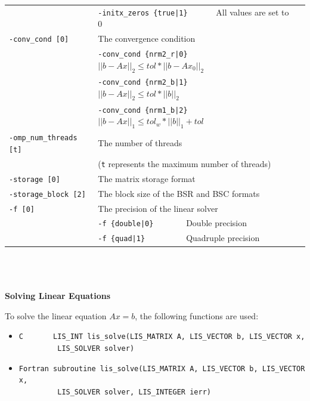 \documentclass[a4paper]{article}
\begin{document}
\begin{minipage}[t]{\textwidth}
\begin{center}
\begin{tabular}{l|ll}
                       & \verb=-initx_zeros {true|1}      =  All values are set to $0$ \\
\verb=-conv_cond [0]= & The convergence condition  \\
                       & \verb=-conv_cond {nrm2_r|0}     =  $||b-Ax||_2 \le tol * ||b-Ax_0||_2$ \\
                       & \verb=-conv_cond {nrm2_b|1}     =  $||b-Ax||_2 \le tol * ||b||_2$ \\
                       & \verb=-conv_cond {nrm1_b|2}     =  $||b-Ax||_1 \le tol_w * ||b||_1 + tol$\\
\verb=-omp_num_threads [t]= & The number of threads        \\ 
                            & (\verb=t= represents the maximum number of
 threads) \\
\verb=-storage [0]=    & The matrix storage format \\
\verb=-storage_block [2]=& The block size of the BSR and BSC formats\\ 
\verb=-f [0]=          & The precision of the linear solver\\
                       & \verb=-f {double|0}       =  Double precision \\ 
                       & \verb=-f {quad|1}         =  Quadruple precision \\
\hline         
\end{tabular}
\end{center}
\end{minipage}
\\ \\ \\
\noindent
{\bf Solving Linear Equations}

To solve the linear equation $Ax = b$, the following functions are used:
\begin{itemize}
\item \verb|C       LIS_INT lis_solve(LIS_MATRIX A, LIS_VECTOR b, LIS_VECTOR x,|\\
      \verb|         LIS_SOLVER solver)|
\item \verb|Fortran subroutine lis_solve(LIS_MATRIX A, LIS_VECTOR b, LIS_VECTOR x,|\\
      \verb|         LIS_SOLVER solver, LIS_INTEGER ierr)|
\end{itemize}
\end{document}
